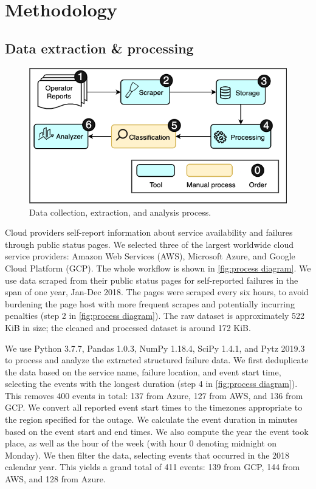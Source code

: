 \section{Methodology}
\subsection{Data extraction \& processing}

\begin{figure}[h]
  \centering
  \includegraphics[scale=0.5]{diagrams/process.png}
  \caption{Data collection, extraction, and analysis process.}
  \label{fig:process diagram}
\end{figure}
Cloud providers self-report information about service availability and failures through public status pages.
We selected three of the largest worldwide cloud service providers: Amazon Web Services (AWS), Microsoft Azure, and Google Cloud Platform (GCP).
The whole workflow is shown in \autoref{fig:process diagram}.
We use data scraped from their public status pages for self-reported failures \cite{awsFeed, gcpFeed, azureFeed} in the span of one year, Jan-Dec 2018.
The pages were scraped every six hours, to avoid burdening the page host with more frequent scrapes and potentially incurring penalties (step 2 in \autoref{fig:process diagram}).
The raw dataset is approximately 522 KiB in size; the cleaned and processed dataset is around 172 KiB.

We use Python 3.7.7, Pandas 1.0.3, NumPy 1.18.4, SciPy 1.4.1, and Pytz 2019.3 to process and analyze the extracted structured failure data.
We first deduplicate the data based on the service name, failure location, and event start time, selecting the events with the longest duration (step 4 in \autoref{fig:process diagram}).
This removes 400 events in total: 137 from Azure, 127 from AWS, and 136 from GCP.
We convert all reported event start times to the timezones appropriate to the region specified for the outage.
We calculate the event duration in minutes based on the event start and end times.
We also compute the year the event took place, as well as the hour of the week (with hour 0 denoting midnight on Monday).
We then filter the data, selecting events that occurred in the 2018 calendar year.
This yields a grand total of 411 events: 139 from GCP, 144 from AWS, and 128 from Azure.

